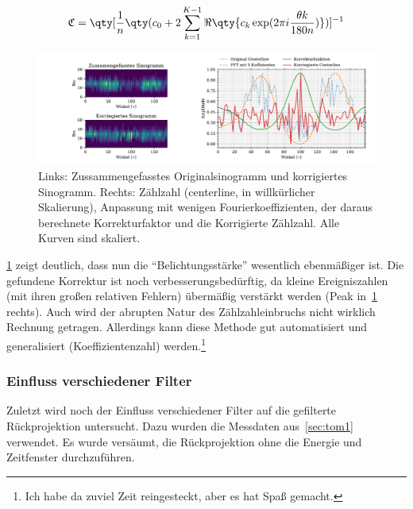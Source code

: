 \documentclass[slug=PET, room=Andreas-Schubert-Bau\,\ 424A,
supervisor=Carsten\ Bittrich, coursedate=10.\ 01.\ 2020, ngerman]{../../Lab_Report_LaTeX/lab_report}
\begin{document}
\begin{equation}
  \label{eq:correction}
  \mathfrak{C} = \qty[\frac{1}{n}
  \qty(c_0 + 2\sum_{k=1}^{K-1}{\Re\qty{c_k\exp(2\pi i \frac{\theta k}{180 n})}})]^{-1}
\end{equation}

\begin{figure}[h]
  \centering
  \includegraphics[width=\textwidth]{../auswertung/figs/tom2/raw_and_corrected.pdf}
  \caption[Sinogramme und Korrekturfunktion]{Links: Zussammengefasstes
    Originalsinogramm und korrigiertes Sinogramm. Rechts: Z\"ahlzahl
    (centerline, in willk\"urlicher Skalierung), Anpassung mit wenigen
  Fourierkoeffizienten, der daraus berechnete Korrekturfaktor und die
  Korrigierte Z\"ahlzahl. Alle Kurven sind skaliert.}
  \label{fig:tom2-raw_and_corrected}
\end{figure}

\ref{fig:tom2-raw_and_corrected} zeigt deutlich, dass nun die
``Belichtungsst\"arke'' wesentlich ebenm\"a\ss{}iger ist. Die
gefundene Korrektur ist noch verbesserungsbed\"urftig, da kleine
Ereigniszahlen (mit ihren gro\ss{}en relativen Fehlern)
\"uberm\"a\ss{}ig verst\"arkt werden (Peak
in~\ref{fig:tom2-raw_and_corrected} rechts). Auch wird der abrupten
Natur des Z\"ahlzahleinbruchs nicht wirklich Rechnung
getragen. Allerdings kann diese Methode gut automatisiert und
generalisiert (Koeffizientenzahl) werden.\footnote{Ich habe da zuviel
  Zeit reingesteckt, aber es hat Spa\ss{} gemacht.}

\subsubsection{Einfluss verschiedener Filter}
\label{sec:filter}

Zuletzt wird noch der Einfluss verschiedener Filter auf die gefilterte Rückprojektion
untersucht. Dazu wurden die Messdaten aus~\ref{sec:tom1} verwendet. Es
wurde vers\"aumt, die R\"uckprojektion ohne die Energie und Zeitfenster
durchzuf\"uhren.
\end{document}
